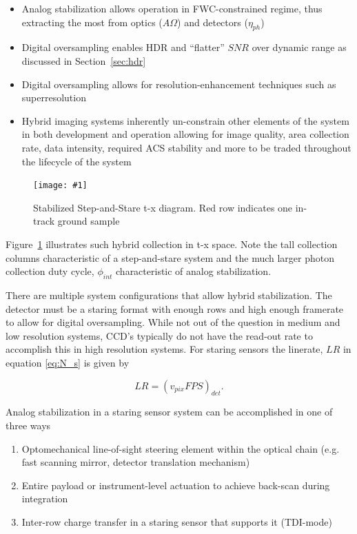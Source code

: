 \documentclass[]{spieman}  %
\newcommand{\includefigure}[3]
{
  \begin{figure}[h!tb]
  \centering
  \texttt{[image: \#1]}
  \caption[]{#3}
  \label{#2}
  \end{figure}
}
\begin{document}
\begin{itemize}
    \item Analog stabilization allows operation in FWC-constrained regime, thus extracting the most from optics ($A\Omega$) and detectors ($\eta_{ph}$)
    \item Digital oversampling enables HDR and ``flatter'' $SNR$ over dynamic range as discussed in Section~\ref{sec:hdr}
    \item Digital oversampling allows for resolution-enhancement techniques such as superresolution
    \item Hybrid imaging systems inherently un-constrain other elements of the system in both development and operation allowing for image quality, area collection rate, data intensity, required ACS stability and more to be traded throughout the lifecycle of the system
\end{itemize}

\includefigure{figures/stab_step_stare.pgf}{fig:stab_step_stare}{Stabilized Step-and-Stare t-x diagram.  Red row indicates one in-track ground sample}

Figure~\ref{fig:stab_step_stare} illustrates such hybrid collection in t-x space.  Note the tall collection columns characteristic of a step-and-stare system and the much larger photon collection duty cycle, $\phi_{int}$ characteristic of analog stabilization.  

There are multiple system configurations that allow hybrid stabilization.  The detector must be a staring format with enough rows and high enough framerate to allow for digital oversampling.  While not out of the question in medium and low resolution systems, CCD's typically do not have the read-out rate to accomplish this in high resolution systems.  For staring sensors the linerate, $LR$ in equation \eqref{eq:N_s} is given by

\begin{equation}
\label{eq:lr_framing}    
LR = \left(v_{pix}FPS\right)_{det}.
\end{equation}

Analog stabilization in a staring sensor system can be accomplished in one of three ways

\begin{enumerate}
    \item Optomechanical line-of-sight steering element within the optical chain (e.g. fast scanning mirror, detector translation mechanism) \cite{patent:dirk}
    \item Entire payload or instrument-level actuation to achieve back-scan during integration \cite{patent:jonny}
    \item Inter-row charge transfer in a staring sensor that supports it (TDI-mode)
\end{enumerate}
\end{document}
